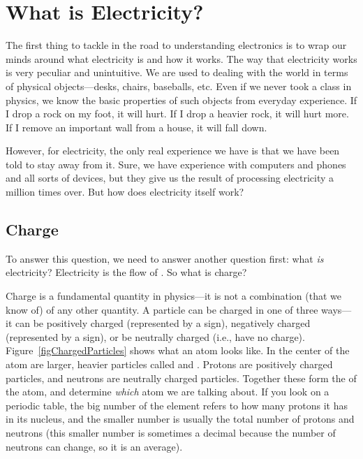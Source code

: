 \chapter{What is Electricity?}
\label{electricitybasics}

The first thing to tackle in the road to understanding electronics is to wrap our minds around what electricity is and how it works.
The way that electricity works is very peculiar and unintuitive.
We are used to dealing with the world in terms of physical objects---desks, chairs, baseballs, etc.
Even if we never took a class in physics, we know the basic properties of such objects from everyday experience.
If I drop a rock on my foot, it will hurt.
If I drop a heavier rock, it will hurt more.
If I remove an important wall from a house, it will fall down.

However, for electricity, the only real experience we have is that we have been told to stay away from it.
Sure, we have experience with computers and phones and all sorts of devices, but they give us the result of processing electricity a million times over.
But how does electricity itself work?

\section{Charge}

To answer this question, we need to answer another question first: what \emph{is} electricity?
Electricity is the flow of .
So what is charge?

Charge is a fundamental quantity in physics---it is not a combination (that we know of) of any other quantity.
A particle can be charged in one of three ways---it can be positively charged (represented by a \icode{+} sign), negatively charged (represented by a \icode{-} sign), or be neutrally charged (i.e., have no charge).
Figure~\ref{figChargedParticles} shows what an atom looks like.  
In the center of the atom are larger, heavier particles called  and .
Protons are positively charged particles, and neutrons are neutrally charged particles.
Together these form the  of the atom, and determine \emph{which} atom we are talking about.
If you look on a periodic table, the big number of the element refers to how many protons it has in its nucleus, and the smaller number is usually the total number of protons and neutrons (this smaller number is sometimes a decimal because the number of neutrons can change, so it is an average).

